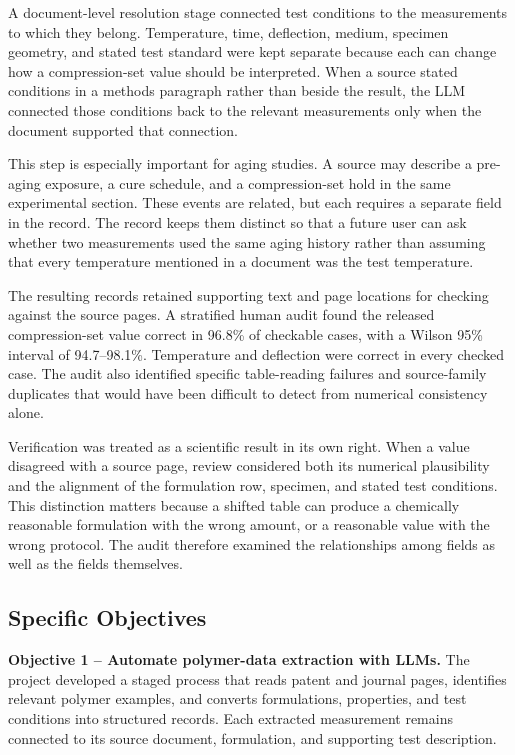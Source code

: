 \documentclass[10pt]{article}
\begin{document}
A document-level resolution stage connected test conditions to the measurements
to which they belong. Temperature, time, deflection, medium, specimen geometry,
and stated test standard were kept separate because each can change how a
compression-set value should be interpreted. When a source stated conditions
in a methods paragraph rather than beside the result, the LLM connected those
conditions back to the relevant measurements only when the document supported
that connection.

This step is especially important for aging studies. A source may describe a
pre-aging exposure, a cure schedule, and a compression-set hold in the same
experimental section. These events are related, but each requires a separate
field in the record.
The record keeps them distinct so that a future user can ask whether two
measurements used the same aging history rather than assuming that every
temperature mentioned in a document was the test temperature.

The resulting records retained supporting text and page locations for checking
against the source pages. A stratified human audit found the released
compression-set value correct in 96.8\% of checkable cases, with a Wilson 95\%
interval of 94.7--98.1\%. Temperature and deflection were correct in every
checked case. The audit also identified specific table-reading failures and
source-family duplicates that would have been difficult to detect from
numerical consistency alone.

Verification was treated as a scientific result in its own right. When a value
disagreed with a source page, review considered both its numerical plausibility
and the alignment of the formulation row, specimen, and stated test conditions.
This distinction matters because a shifted table can produce a chemically
reasonable formulation with the wrong amount, or a reasonable value with the
wrong protocol. The audit therefore examined the relationships among fields
as well as the fields themselves.

\subsection{Specific Objectives}
\textbf{Objective 1 -- Automate polymer-data extraction with LLMs.} The project
developed a staged process that reads patent and journal pages, identifies
relevant polymer examples, and converts formulations, properties, and test
conditions into structured records. Each extracted measurement remains
connected to its source document, formulation, and supporting test description.
\end{document}

